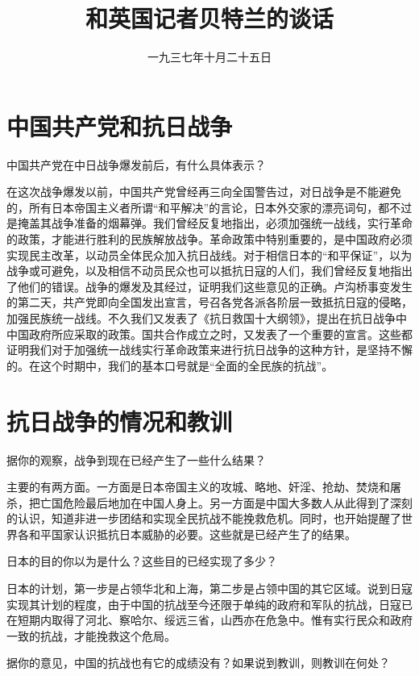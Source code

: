 
\title{和英国记者贝特兰的谈话}
\date{一九三七年十月二十五日}
\maketitle


\section{中国共产党和抗日战争}

中国共产党在中日战争爆发前后，有什么具体表示？

在这次战争爆发以前，中国共产党曾经再三向全国警告过，对日战争是不能避免的，所有日本帝国主义者所谓“和平解决”的言论，日本外交家的漂亮词句，都不过是掩盖其战争准备的烟幕弹。我们曾经反复地指出，必须加强统一战线，实行革命的政策，才能进行胜利的民族解放战争。革命政策中特别重要的，是中国政府必须实现民主改革，以动员全体民众加入抗日战线。对于相信日本的“和平保证”，以为战争或可避免，以及相信不动员民众也可以抵抗日寇的人们，我们曾经反复地指出了他们的错误。战争的爆发及其经过，证明我们这些意见的正确。卢沟桥事变发生的第二天，共产党即向全国发出宣言，号召各党各派各阶层一致抵抗日寇的侵略，加强民族统一战线。不久我们又发表了《抗日救国十大纲领》，提出在抗日战争中中国政府所应采取的政策。国共合作成立之时，又发表了一个重要的宣言。这些都证明我们对于加强统一战线实行革命政策来进行抗日战争的这种方针，是坚持不懈的。在这个时期中，我们的基本口号就是“全面的全民族的抗战”。

\section{抗日战争的情况和教训}

据你的观察，战争到现在已经产生了一些什么结果？

主要的有两方面。一方面是日本帝国主义的攻城、略地、奸淫、抢劫、焚烧和屠杀，把亡国危险最后地加在中国人身上。另一方面是中国大多数人从此得到了深刻的认识，知道非进一步团结和实现全民抗战不能挽救危机。同时，也开始提醒了世界各和平国家认识抵抗日本威胁的必要。这些就是已经产生了的结果。

日本的目的你以为是什么？这些目的已经实现了多少？

日本的计划，第一步是占领华北和上海，第二步是占领中国的其它区域。说到日寇实现其计划的程度，由于中国的抗战至今还限于单纯的政府和军队的抗战，日寇已在短期内取得了河北、察哈尔、绥远三省，山西亦在危急中。惟有实行民众和政府一致的抗战，才能挽救这个危局。

据你的意见，中国的抗战也有它的成绩没有？如果说到教训，则教训在何处？

